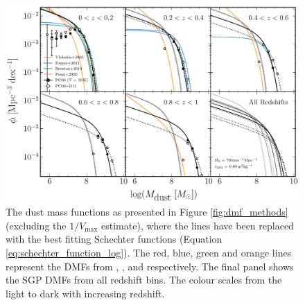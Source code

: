 \begin{figure}
	\centering
	\includegraphics[width=0.9\columnwidth]{Figures/dmf_schechter.pdf}
	\caption[Schechter functions derived from the SGP DMFs alongside relevant studies]{The dust mass functions as presented in Figure \ref{fig:dmf_methods} (excluding the $1/V_{\textrm{max}}$ estimate), where the lines have been replaced with the best fitting Schechter functions (Equation \ref{eq:schechter_function_log}). The red, blue, green and orange lines represent the DMFs from \citealt{Vlahakis_2005}, \citealt{Dunne_2011}, \citealt{Beeston_2018} and \citealt{Pozzi_2020} respectively. The final panel shows the SGP DMFs from all redshift bins. The colour scales from the light to dark with increasing redshift.}
	\label{fig:dmf_schechter}
\end{figure}

